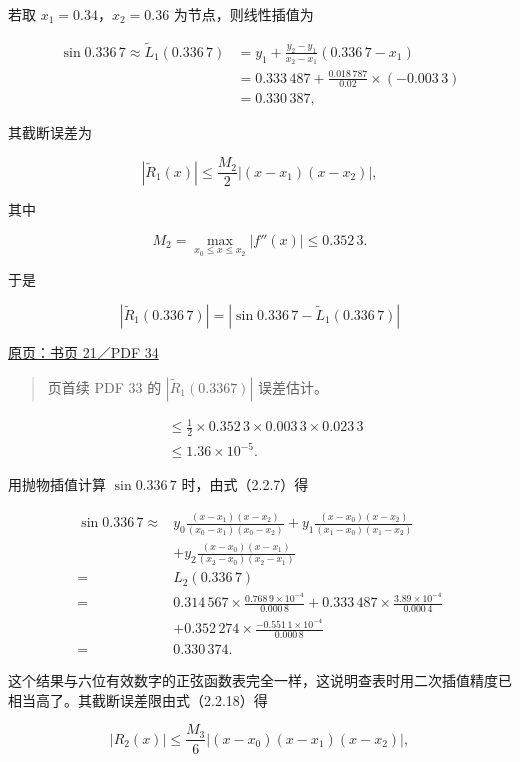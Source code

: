 \documentclass[
  10pt,
  fontset=fandol]{ctexart}
\begin{document}
若取 \(x_1=0.34\)，\(x_2=0.36\) 为节点，则线性插值为

\[
\begin{aligned}
\sin0.336\,7\approx\widetilde L_1(0.336\,7)
&=y_1+\frac{y_2-y_1}{x_2-x_1}(0.336\,7-x_1)\\
&=0.333\,487+\frac{0.018\,787}{0.02}\times(-0.003\,3)\\
&=0.330\,387,
\end{aligned}
\]

其截断误差为

\[
|\widetilde R_1(x)|\le\frac{M_2}{2}|(x-x_1)(x-x_2)|,
\]

其中

\[
M_2=\max_{x_0\le x\le x_2}|f''(x)|\le0.352\,3.
\]

于是

\[
|\widetilde R_1(0.336\,7)|=|\sin0.336\,7-\widetilde L_1(0.336\,7)|
\]

\href{../../source-images/pdf-034.jpeg}{原页：书页 21／PDF 34}

\begin{quote}
页首续 PDF 33 的 \(|\widetilde R_1(0.3367)|\) 误差估计。
\end{quote}

\[
\begin{aligned}
&\le\frac12\times0.352\,3\times0.003\,3\times0.023\,3\\
&\le1.36\times10^{-5}.
\end{aligned}
\]

用抛物插值计算 \(\sin0.336\,7\) 时，由式（2.2.7）得

\[
\begin{aligned}
\sin0.336\,7\approx{}&
y_0\frac{(x-x_1)(x-x_2)}{(x_0-x_1)(x_0-x_2)}
+y_1\frac{(x-x_0)(x-x_2)}{(x_1-x_0)(x_1-x_2)}\\
&+y_2\frac{(x-x_0)(x-x_1)}{(x_2-x_0)(x_2-x_1)}\\
={}&L_2(0.336\,7)\\
={}&0.314\,567\times\frac{0.768\,9\times10^{-4}}{0.000\,8}
+0.333\,487\times\frac{3.89\times10^{-4}}{0.000\,4}\\
&+0.352\,274\times\frac{-0.551\,1\times10^{-4}}{0.000\,8}\\
={}&0.330\,374.
\end{aligned}
\]

这个结果与六位有效数字的正弦函数表完全一样，这说明查表时用二次插值精度已相当高了。其截断误差限由式（2.2.18）得

\[
|R_2(x)|\le\frac{M_3}{6}|(x-x_0)(x-x_1)(x-x_2)|,
\]
\end{document}
